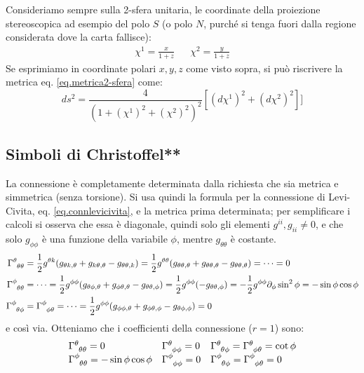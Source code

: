 Consideriamo sempre sulla 2-sfera unitaria, le coordinate della proiezione stereoscopica ad esempio del polo $S$ (o polo $N$, purché si tenga fuori dalla regione considerata dove la carta fallisce):
\begin{align*}
    \chi^1 = \frac{x}{1+z} & &
    \chi^2 = \frac{y}{1+z}
\end{align*}
Se esprimiamo in coordinate polari $x, y, z$ come visto sopra, si può riscrivere la metrica eq. \ref{eq.metrica2-sfera} come:
\begin{equation}
    ds^2 = \frac{4}{(1 + (\chi^1)^2 + (\chi^2)^2)^2}\left[(d\chi^1)^2 + (d\chi^2)^2\right]]
    \label{eq.metrica_2sfera_conformpiatta}
\end{equation}
\subsection{Simboli di Christoffel**}
La connessione è completamente determinata dalla richiesta che sia metrica e simmetrica (senza torsione). Si usa quindi la formula per la connessione di Levi-Civita, eq. \ref{eq.connlevicivita}, e la metrica prima determinata; per semplificare i calcoli si osserva che essa è diagonale, quindi solo gli elementi $g^{ii},g_{ii}\neq 0$, e che solo $g_{\phi\phi}$ è una funzione della variabile $\phi$, mentre $g_{\theta\theta}$ è costante.
\begin{align*}
    \tensor{\Gamma}{^\theta_{\theta\theta}} &= \frac{1}{2}g^{\theta k}(g_{\theta k , \theta} + g_{k \theta, \theta} - g_{\theta \theta , k} ) = \frac{1}{2}g^{\theta \theta}(g_{\theta \theta , \theta} + g_{\theta \theta, \theta} - g_{\theta \theta , \theta} ) = \dots = 0 \\
    \tensor{\Gamma}{^\phi_{\theta\theta}} &= \dots = \frac{1}{2}g^{\phi\phi}( g_{\theta\phi , \theta} + g_{\phi\theta, \theta} - g_{\theta \theta , \phi} ) = \frac{1}{2} g^{\phi\phi}( - g_{\theta \theta , \phi} ) = - \frac{1}{2} g^{\phi\phi}\partial_\phi\sin^2\phi = -\sin\phi \cos \phi\\
    \tensor{\Gamma}{^\phi_{\theta\phi}} &=  \tensor{\Gamma}{^\phi_{\phi\theta}} = \dots = \frac{1}{2}g^{\phi\phi}( g_{\phi\phi , \theta} + g_{\phi\theta, \phi} - g_{\theta \phi , \phi} ) = 0
\end{align*}
e così via. Otteniamo che i coefficienti della connessione ($r=1$) sono:
\begin{equation*}
\begin{array}{lll}
    \tensor{\Gamma}{^\theta_{\theta\theta}} = 0 &\tensor{\Gamma}{^\theta_{\phi\phi}} = 0 &\tensor{\Gamma}{^\theta_{\theta\phi}} = \tensor{\Gamma}{^\theta_{\phi\theta}} =  \cot\phi
    \\
    \tensor{\Gamma}{^\phi_{\theta\theta}} = -\sin\phi\cos\phi
    &\tensor{\Gamma}{^\phi_{\phi\phi}} = 0 &\tensor{\Gamma}{^\phi_{\theta\phi}} = \tensor{\Gamma}{^\phi_{\phi\theta}} =  0
\end{array}
\end{equation*}

